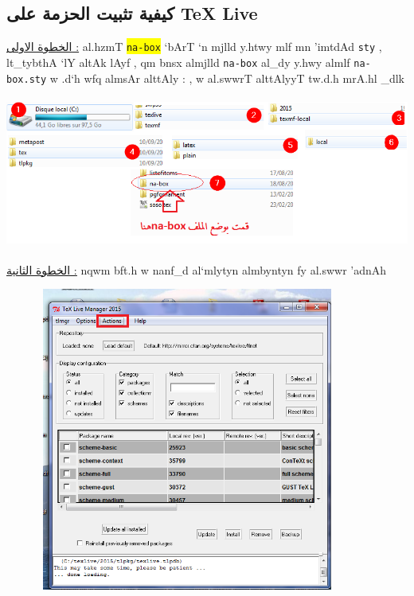 \documentclass[8pt,a4paper]{article}
\begin{document}
\begin{arab}
\section{ كيفية تثبيت الحزمة على  \textfrench{TeX Live}  } 
\underline {\underline { الخطوة الاولى :}}  
al.hzmT \colorbox{yellow}{\texttt{na-box}} `bArT `n mjlld y.htwy mlf mn 'imtdAd \texttt{sty} , lt_tybthA `lY altAk lAyf , qm bnsx almjlld  \texttt{na-box} al_dy y.hwy almlf \texttt{na-box.sty} w .d`h wfq almsAr alttAly :
 , w al.swwrT alttAlyyT tw.d.h mrA.hl  _dlk 
\begin{center}
\includegraphics[height=5cm,width=18cm]{nabox}
\end{center}
\underline {\underline { الخطوة الثانية :}} 
nqwm bft.h 
w nanf_d al`mlytyn almbyntyn fy al.swwr 'adnAh 
\begin{center}
 \includegraphics[height=10cm,width=12cm]{29}
\end{center}
\begin{center}

\end{center}
\end{arab}
\end{document}

